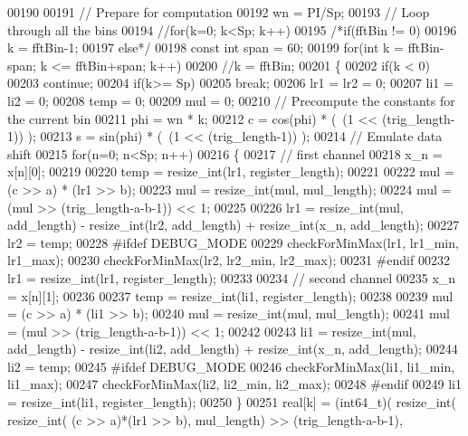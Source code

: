 \begin{DoxyCode}
00190 
00191   \textcolor{comment}{// Prepare for computation}
00192   wn = PI/Sp;
00193   \textcolor{comment}{// Loop through all the bins}
00194   \textcolor{comment}{//for(k=0; k<Sp; k++)}
00195   \textcolor{comment}{/*if(fftBin != 0)}
00196 \textcolor{comment}{    k = fftBin-1;}
00197 \textcolor{comment}{  else*/}
00198     \textcolor{keyword}{const} \textcolor{keywordtype}{int} span = 60;
00199 \textcolor{keywordflow}{for}(\textcolor{keywordtype}{int} k = fftBin-span; k <= fftBin+span; k++)
00200   \textcolor{comment}{//k = fftBin;}
00201   \{
00202       \textcolor{keywordflow}{if}(k < 0)
00203         \textcolor{keywordflow}{continue};
00204     \textcolor{keywordflow}{if}(k>= Sp)
00205         \textcolor{keywordflow}{break};
00206     lr1 = lr2 = 0;
00207     li1 = li2 = 0;
00208     temp = 0;
00209     mul = 0;
00210     \textcolor{comment}{// Precompute the constants for the current bin}
00211     phi = wn * k;
00212     c = cos(phi) * (~(1 << (trig\_length-1)) );
00213     s = sin(phi) * (~(1 << (trig\_length-1)) );
00214     \textcolor{comment}{// Emulate data shift}
00215     \textcolor{keywordflow}{for}(n=0; n<Sp; n++)
00216     \{
00217       \textcolor{comment}{// first channel}
00218       x\_n = x[n][0];
00219 
00220       temp = resize_int(lr1, register\_length);
00221 
00222       mul  = (c >> a) * (lr1 >> b);
00223       mul  = resize_int(mul, mul\_length);
00224       mul  = (mul >> (trig\_length-a-b-1)) << 1;
00225 
00226       lr1 = resize_int(mul, add\_length) - resize_int(lr2, add\_length) + 
      resize_int(x\_n, add\_length);
00227       lr2 = temp;
00228 \textcolor{preprocessor}{      #ifdef DEBUG\_MODE}
00229         checkForMinMax(lr1, lr1\_min, lr1\_max);
00230         checkForMinMax(lr2, lr2\_min, lr2\_max);
00231 \textcolor{preprocessor}{      #endif}
00232       lr1 = resize_int(lr1, register\_length);
00233 
00234       \textcolor{comment}{// second channel}
00235       x\_n = x[n][1];
00236 
00237       temp = resize_int(li1, register\_length);
00238 
00239       mul  = (c >> a) * (li1 >> b);
00240       mul  = resize_int(mul, mul\_length);
00241       mul  = (mul >> (trig\_length-a-b-1)) << 1;
00242 
00243       li1 = resize_int(mul, add\_length) - resize_int(li2, add\_length) + 
      resize_int(x\_n, add\_length);
00244       li2 = temp;
00245 \textcolor{preprocessor}{      #ifdef DEBUG\_MODE}
00246         checkForMinMax(li1, li1\_min, li1\_max);
00247         checkForMinMax(li2, li2\_min, li2\_max);
00248 \textcolor{preprocessor}{      #endif}
00249       li1 = resize_int(li1, register\_length);
00250     \}
00251     real[k] = (int64\_t)( resize_int( resize_int( (c >> a)*(lr1 >> b), mul\_length) >> (trig\_length-a-b-1), 

\end{DoxyCode}
